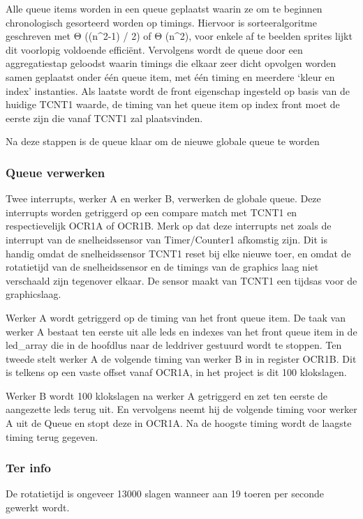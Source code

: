 \documentclass[12pt]{ugentreport}
\begin{document}
Alle queue items worden in een queue geplaatst waarin ze om te beginnen chronologisch gesorteerd worden op timings. Hiervoor is 
sorteeralgoritme geschreven met Θ ((n^2-1) / 2) of Θ (n^2), voor enkele af te beelden sprites lijkt dit voorlopig voldoende efficiënt. 
Vervolgens wordt de queue door een aggregatiestap geloodst waarin timings die elkaar zeer dicht opvolgen worden samen geplaatst onder 
één queue item, met één timing en meerdere ‘kleur en index’ instanties. Als laatste wordt de front eigenschap ingesteld op basis van de 
huidige TCNT1 waarde, de timing van het queue item op index front moet de eerste zijn die vanaf TCNT1 zal plaatsvinden.

Na deze stappen is de queue klaar om de nieuwe globale queue te worden


\subsubsection{Queue verwerken}
Twee interrupts, werker A en werker B, verwerken de globale queue. Deze interrupts worden getriggerd op een compare match met TCNT1 en 
respectievelijk OCR1A of OCR1B. Merk op dat deze interrupts net zoals de interrupt van de snelheidssensor van Timer/Counter1 afkomstig 
zijn. Dit is handig omdat de snelheidssensor TCNT1 reset bij elke nieuwe toer, en omdat de rotatietijd van de snelheidssensor en de 
timings van de graphics laag niet verschaald zijn tegenover elkaar. De sensor maakt van TCNT1 een tijdsas voor de graphicslaag.

Werker A wordt getriggerd op de timing van het front queue item. De taak van werker A bestaat ten eerste uit alle leds en indexes van 
het front queue item in de led_array die in de hoofdlus naar de leddriver gestuurd wordt te stoppen. Ten tweede stelt werker A de 
volgende timing van werker B in in register OCR1B. Dit is telkens op een vaste offset vanaf OCR1A, in het project is dit 100 
klokslagen.

Werker B wordt 100 klokslagen na werker A getriggerd en zet ten eerste de aangezette leds terug uit. En vervolgens neemt hij de 
volgende timing voor werker A uit de Queue en stopt deze in OCR1A. Na de hoogste timing wordt de laagste timing terug gegeven.


\subsubsection{Ter info}
De rotatietijd is ongeveer 13000 slagen wanneer aan 19 toeren per seconde gewerkt wordt.
\end{document}
